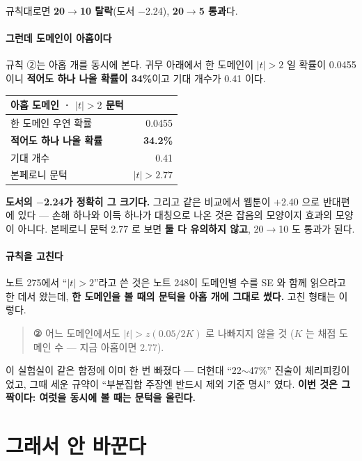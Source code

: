 \documentclass[10pt]{article}
\begin{document}
규칙대로면 \textbf{20$\to$10 탈락}(도서 $-$2.24), \textbf{20$\to$5 통과}다.

\paragraph{그런데 도메인이 아홉이다} 규칙 ②는 아홉 개를 동시에 본다. 귀무
아래에서 한 도메인이 $|t|{>}2$ 일 확률이 0.0455 이니 \textbf{적어도 하나
나올 확률이 34\%}이고 기대 개수가 0.41 이다.

\begin{center}\small
\begin{tabular}{lr}
\hline
아홉 도메인 · $|t|{>}2$ 문턱 & \\
\hline
한 도메인 우연 확률 & 0.0455 \\
\textbf{적어도 하나 나올 확률} & \textbf{34.2\%} \\
기대 개수 & 0.41 \\
본페로니 문턱 & $|t| > 2.77$ \\
\hline
\end{tabular}
\end{center}

\textbf{도서의 $-$2.24가 정확히 그 크기다.} 그리고 같은 비교에서 웹툰이
$+$2.40 으로 반대편에 있다 --- 손해 하나와 이득 하나가 대칭으로 나온 것은
잡음의 모양이지 효과의 모양이 아니다. 본페로니 문턱 2.77 로 보면 \textbf{둘
다 유의하지 않고}, 20$\to$10 도 통과가 된다.

\paragraph{규칙을 고친다} 노트 275에서 ``$|t|{>}2$''라고 쓴 것은 노트 248이
도메인별 수를 SE 와 함께 읽으라고 한 데서 왔는데, \textbf{한 도메인을 볼
때의 문턱을 아홉 개에 그대로 썼다.} 고친 형태는 이렇다.

\begin{quote}\small
\textbf{②} 어느 도메인에서도 $|t| > z(0.05/2K)$ 로 나빠지지 않을 것
($K$ 는 채점 도메인 수 --- 지금 아홉이면 2.77).
\end{quote}

이 실험실이 같은 함정에 이미 한 번 빠졌다 --- 더현대 ``22$\sim$47\%'' 진술이
체리피킹이었고, 그때 세운 규약이 ``부분집합 주장엔 반드시 제외 기준 명시''
였다. \textbf{이번 것은 그 짝이다: 여럿을 동시에 볼 때는 문턱을 올린다.}

\section{그래서 안 바꾼다}
\end{document}
